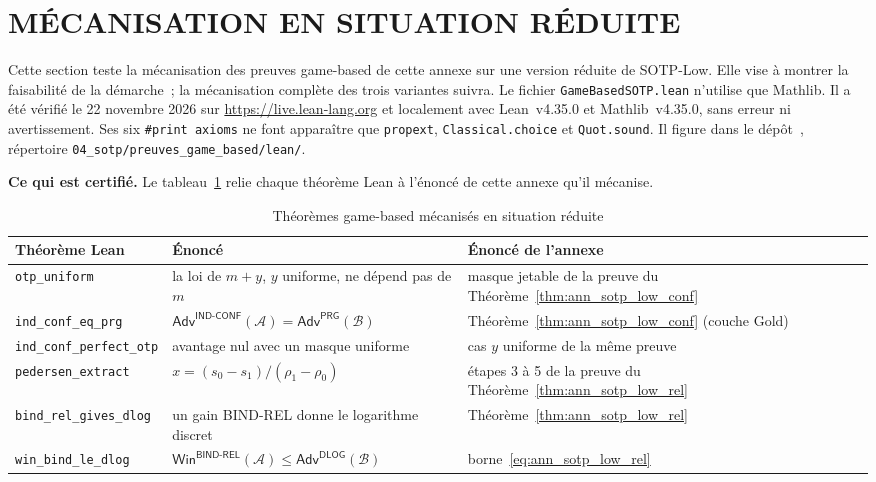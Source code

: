 \section{M\'ECANISATION EN SITUATION R\'EDUITE}
\label{sec:gamebased_mecanisation}
\begin{sloppypar}
Cette section teste la m\'ecanisation des preuves game-based de cette annexe sur une
version r\'eduite de SOTP-Low. Elle vise \`a montrer la faisabilit\'e de la d\'emarche~;
la m\'ecanisation compl\`ete des trois variantes suivra. Le fichier
\texttt{GameBasedSOTP.lean} n'utilise que Mathlib. Il a \'et\'e v\'erifi\'e le 22 novembre
2026 sur \url{https://live.lean-lang.org} et localement avec Lean~v4.35.0 et
Mathlib~v4.35.0, sans erreur ni avertissement. Ses six \texttt{\#print axioms} ne
font appara\^itre que \texttt{propext}, \texttt{Classical.choice} et
\texttt{Quot.sound}. Il figure dans le d\'ep\^ot~\cite{CROTrilemmaDepot}, r\'epertoire
\texttt{04\_sotp/preuves\_game\_based/lean/}.

\medskip
\noindent\textbf{Ce qui est certifi\'e.} Le tableau~\ref{tab:ann_g_mecanisation} relie
chaque th\'eor\`eme Lean \`a l'\'enonc\'e de cette annexe qu'il m\'ecanise.

\begin{table}[htbp]
\centering
\caption{Th\'eor\`emes game-based m\'ecanis\'es en situation r\'eduite}
\label{tab:ann_g_mecanisation}
{\small
\begin{tabular}{@{}p{4.2cm}p{4.6cm}p{4.6cm}@{}}
\toprule
\textbf{Th\'eor\`eme Lean} & \textbf{\'Enonc\'e} & \textbf{\'Enonc\'e de l'annexe} \\
\midrule
\texttt{otp\_uniform} & la loi de $m + y$, $y$ uniforme, ne d\'epend pas de $m$ & masque jetable de la preuve du Th\'eor\`eme~\ref{thm:ann_sotp_low_conf} \\
\texttt{ind\_conf\_eq\_prg} & $\mathsf{Adv}^{\mathsf{IND\text{-}CONF}}(\mathcal{A}) = \mathsf{Adv}^{\mathsf{PRG}}(\mathcal{B})$ & Th\'eor\`eme~\ref{thm:ann_sotp_low_conf} (couche Gold) \\
\texttt{ind\_conf\_perfect\_otp} & avantage nul avec un masque uniforme & cas $y$ uniforme de la m\^eme preuve \\
\texttt{pedersen\_extract} & $x = (s_0 - s_1)/(\rho_1 - \rho_0)$ & \'etapes 3 \`a 5 de la preuve du Th\'eor\`eme~\ref{thm:ann_sotp_low_rel} \\
\texttt{bind\_rel\_gives\_dlog} & un gain BIND-REL donne le logarithme discret & Th\'eor\`eme~\ref{thm:ann_sotp_low_rel} \\
\texttt{win\_bind\_le\_dlog} & $\mathsf{Win}^{\mathsf{BIND\text{-}REL}}(\mathcal{A}) \leq \mathsf{Adv}^{\mathsf{DLOG}}(\mathcal{B})$ & borne~\eqref{eq:ann_sotp_low_rel} \\
\bottomrule
\end{tabular}
}
\end{table}


\end{sloppypar}

